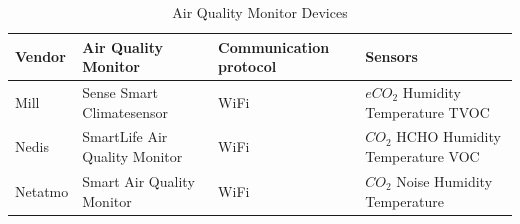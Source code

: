 \begin{table}[!hbtp]
    \centering
    \begin{adjustbox}{width=1\textwidth}
    \caption{Air Quality Monitor Devices}
    \begin{tabular}{| p{3cm} | p{5cm} | p{5cm} | p{3cm} |} 
        \hline
        \textbf{Vendor} & \textbf{Air Quality Monitor} & \textbf{Communication protocol} & \textbf{Sensors} \\
        \hline
        Mill & Sense Smart Climatesensor & WiFi & \(eCO_2\) \newline Humidity \newline Temperature \newline TVOC \\
        \hline
        Nedis & SmartLife Air Quality Monitor & WiFi & \(CO_2\) \newline HCHO \newline Humidity \newline Temperature \newline VOC \\
        \hline
        Netatmo & Smart Air Quality Monitor & WiFi & \(CO_2\) \newline Noise \newline Humidity \newline Temperature \\
        \hline
    \end{tabular}
    \end{adjustbox}
    \label{tab:AQMSurvey}
\end{table}
\FloatBarrier

